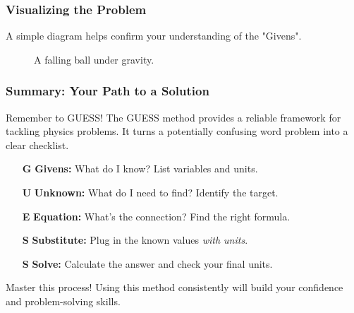 \documentclass{beamer}
\begin{document}
\begin{frame}[allowframebreaks]
    \frametitle{Visualizing the Problem}
    A simple diagram helps confirm your understanding of the "Givens".
    \begin{figure}
    \caption{A falling ball under gravity.}
    \end{figure}
\end{frame}


\begin{frame}[allowframebreaks]
    \frametitle{Summary: Your Path to a Solution}
    \begin{block}{Remember to GUESS!}
        The GUESS method provides a reliable framework for tackling physics problems. It turns a potentially confusing word problem into a clear checklist.
    \end{block}
    \begin{itemize}
        \item[\textbf{G}] \textbf{Givens:} What do I know? List variables and units.
        \item[\textbf{U}] \textbf{Unknown:} What do I need to find? Identify the target.
        \item[\textbf{E}] \textbf{Equation:} What's the connection? Find the right formula.
        \item[\textbf{S}] \textbf{Substitute:} Plug in the known values \textit{with units}.
        \item[\textbf{S}] \textbf{Solve:} Calculate the answer and check your final units.
    \end{itemize}
    \begin{alertblock}{Master this process!}
        Using this method consistently will build your confidence and problem-solving skills.
    \end{alertblock}
\end{frame}
\end{document}
